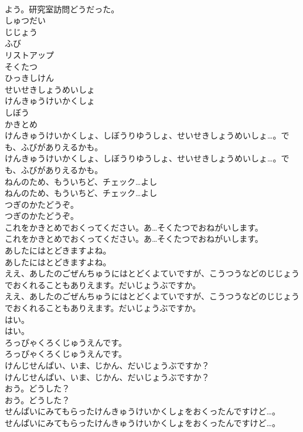 \documentclass[8pt]{extreport}
\begin{document}
\begin{CJK}{UTF8}{min}
\\	よう。研究室訪問どうだった。
\\	しゅつだい
\\	じじょう
\\	ふび
\\	リストアップ
\\	そくたつ
\\	ひっきしけん
\\	せいせきしょうめいしょ
\\	けんきゅうけいかくしょ
\\	しぼう
\\	かきとめ
\\	けんきゅうけいかくしょ、しぼうりゆうしょ、せいせきしょうめいしょ…。でも、ふびがありえるかも。
\\	けんきゅうけいかくしょ、しぼうりゆうしょ、せいせきしょうめいしょ…。でも、ふびがありえるかも。
\\	ねんのため、もういちど、チェック…よし
\\	ねんのため、もういちど、チェック…よし
\\	つぎのかたどうぞ。
\\	つぎのかたどうぞ。
\\	これをかきとめでおくってください。あ…そくたつでおねがいします。
\\	これをかきとめでおくってください。あ…そくたつでおねがいします。
\\	あしたにはとどきますよね。
\\	あしたにはとどきますよね。
\\	ええ、あしたのごぜんちゅうにはとどくよていですが、こうつうなどのじじょうでおくれることもありえます。だいじょうぶですか。
\\	ええ、あしたのごぜんちゅうにはとどくよていですが、こうつうなどのじじょうでおくれることもありえます。だいじょうぶですか。
\\	はい。
\\	はい。
\\	ろっぴゃくろくじゅうえんです。
\\	ろっぴゃくろくじゅうえんです。
\\	けんじせんぱい、いま、じかん、だいじょうぶですか？
\\	けんじせんぱい、いま、じかん、だいじょうぶですか？
\\	おう。どうした？
\\	おう。どうした？
\\	せんぱいにみてもらったけんきゅうけいかくしょをおくったんですけど…。
\\	せんぱいにみてもらったけんきゅうけいかくしょをおくったんですけど…。

\end{CJK}
\end{document}
